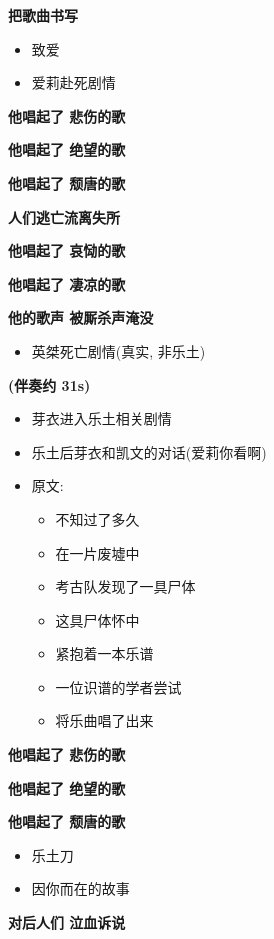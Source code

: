 \documentclass[a4paper]{article}
\begin{document}
\textbf{把歌曲书写}

\begin{itemize}
    \item 致爱
    \item 爱莉赴死剧情
\end{itemize}

\textbf{他唱起了 悲伤的歌}

\textbf{他唱起了 绝望的歌}

\textbf{他唱起了 颓唐的歌}

\textbf{人们逃亡流离失所}

\textbf{他唱起了 哀恸的歌}

\textbf{他唱起了 凄凉的歌}

\textbf{他的歌声 被厮杀声淹没}

\begin{itemize}
    \item 英桀死亡剧情(真实, 非乐土)
\end{itemize}

\textbf{(伴奏约 31s)}

\begin{itemize}
    \item 芽衣进入乐土相关剧情
    \item 乐土后芽衣和凯文的对话(爱莉你看啊)
    \item 原文:
    \begin{itemize}
        \item 不知过了多久
        \item 在一片废墟中
        \item 考古队发现了一具尸体
        \item 这具尸体怀中
        \item 紧抱着一本乐谱
        \item 一位识谱的学者尝试
        \item 将乐曲唱了出来
    \end{itemize}
\end{itemize}

\textbf{他唱起了 悲伤的歌}

\textbf{他唱起了 绝望的歌}

\textbf{他唱起了 颓唐的歌}

\begin{itemize}
    \item 乐土刀
    \item 因你而在的故事
\end{itemize}

\textbf{对后人们 泣血诉说}
\end{document}
